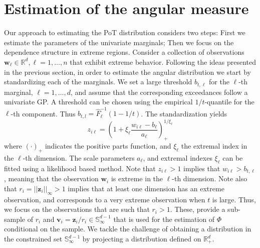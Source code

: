 \section{Estimation of the angular measure\label{sec:methodology}}

Our approach to estimating the PoT distribution considers two 
steps: First we estimate the parameters of the univariate 
marginals; Then we focus on the dependence structure in extreme
regions.
Consider a collection of observations $\bm{w}_\ell \in {\mathbb R}^d,
\ell = 1, \ldots, n$ that exhibit extreme behavior. Following the 
ideas presented in the previous section, in order to estimate the
angular distribution we start by standardizing each
of the marginals. We set a large threshold $b_{t,\ell}$ for the 
$\ell$-th marginal, $\ell = 1, \ldots,d$, and assume that the 
corresponding exceedances follow a univariate GP. A threshold can 
be chosen using the empirical $1/t$-quantile for the $\ell$-th 
component. Thus $b_{t,l} = \hat{F}^{-1}_{\ell}(1 - 1/t)$. The  
standardization  yields
\begin{equation}
        \label{eqn:standardization}
        z_{i\ell} = \left(1 + \xi_{\ell}\frac{w_{i\ell} -
            b_{\ell}}{a_{\ell}}\right)_{+}^{1/\xi_{\ell}}
    \end{equation}
where $(\cdot)_+$ indicates the positive parts function, and 
$\xi_{\ell}$ the extremal index in the $\ell$-th dimension. The scale parameters $a_\ell$, and extremal indexes $\xi_\ell$ can be fitted using a likelihood based method. Note that  $z_{i\ell}> 1$
implies that $w_{i\ell} > b_{t,\ell}$, meaning that the 
observation $\bm{w}_i$ is extreme in the $\ell$-th dimension. 
Note also that $r_i = ||\bm{z}_i||_\infty > 1$ implies that at
least one dimension has an extreme observation, and corresponds 
to a very extreme observation when $t$ is large. Thus, we focus on 
the observations that are such that $r_i > 1$. These, provide a
sub-sample of $r_i$ and $\bm{v}_i = \bm{z}_i /r_i \in 
\mathbb{S}_{\infty}^{d-1}$ that is used for  the estimation of 
$\Phi$ conditional on the sample. We tackle the challenge
of obtaining a distribution in the constrained set  
$\mathbb{S}_{\infty}^{d-1}$ by projecting a distribution defined on
$\mathbb{R}^d_+$.





